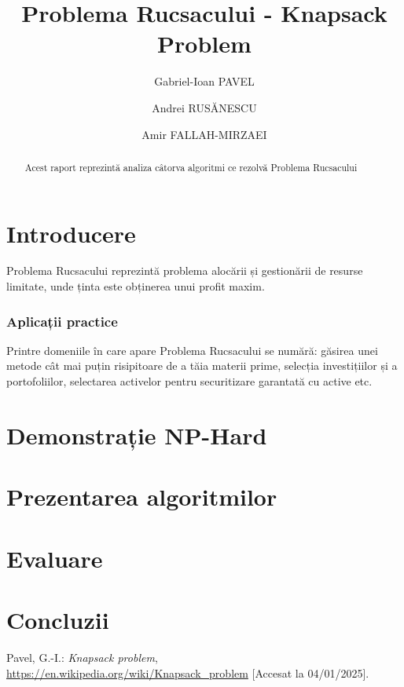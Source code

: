 \documentclass[runningheads]{llncs}
\begin{document}
%
\title{Problema Rucsacului - Knapsack Problem}
%
%
\author{Gabriel-Ioan PAVEL \and
Andrei RUSĂNESCU \and
Amir FALLAH-MIRZAEI}
%
%
\maketitle              %
%
\begin{abstract}
Acest raport reprezintă analiza câtorva algoritmi ce rezolvă Problema Rucsacului

\end{abstract}
%
%
%
\section{Introducere}
Problema Rucsacului reprezintă problema alocării și gestionării de resurse limitate,
unde ținta este obținerea unui profit maxim.

\subsubsection{Aplicații practice} Printre domeniile în care apare Problema
Rucsacului se numără: găsirea unei metode cât mai puțin risipitoare de a tăia
materii prime, selecția investițiilor și a portofoliilor, selectarea activelor
pentru securitizare garantată cu active etc.

\section{Demonstrație NP-Hard}

\section{Prezentarea algoritmilor}

\section{Evaluare}

\section{Concluzii}

%
%
%
% 
% 
%
\begin{thebibliography}{8}
Pavel, G.-I.: \emph{Knapsack problem}, \url{https://en.wikipedia.org/wiki/Knapsack_problem} [Accesat la 04/01/2025].

\end{thebibliography}
\end{document}
